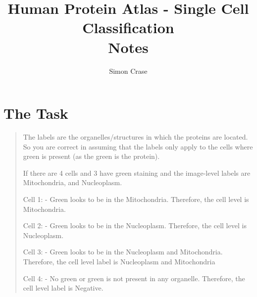 \documentclass[]{article}
\title{Human Protein Atlas - Single Cell Classification\\Notes}
\author{Simon Crase}
\begin{document}
\maketitle



\begin{abstract}

\end{abstract}
\tableofcontents
\listoftables
\section{The Task}

\begin{quotation}
	The labels are the organelles/structures in which the proteins are located. So you are correct in assuming that the labels only apply to the cells where green is present (as the green is the protein).
	
	If there are 4 cells and 3 have green staining and the image-level labels are Mitochondria, and Nucleoplasm.
	
	Cell 1:
	- Green looks to be in the Mitochondria. Therefore, the cell level is Mitochondria.
	
	Cell 2:
	- Green looks to be in the Nucleoplasm. Therefore, the cell level is Nucleoplasm.
	
	Cell 3:
	- Green looks to be in the Nucleoplasm and Mitochondria. Therefore, the cell level label is Nucleoplasm and Mitochondria
	
	Cell 4:
	- No green or green is not present in any organelle. Therefore, the cell level label is Negative. \cite{Schettler2021}
\end{quotation}
\end{document}
